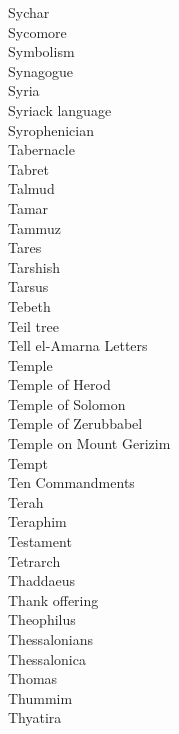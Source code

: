Sychar  \\
Sycomore  \\
Symbolism  \\
Synagogue  \\
Syria  \\
Syriack language  \\
Syrophenician  \\
Tabernacle  \\
Tabret  \\
Talmud  \\
Tamar  \\
Tammuz  \\
Tares  \\
Tarshish  \\
Tarsus  \\
Tebeth  \\
Teil tree  \\
Tell el-Amarna Letters  \\
Temple  \\
Temple of Herod  \\
Temple of Solomon  \\
Temple of Zerubbabel  \\
Temple on Mount Gerizim  \\
Tempt  \\
Ten Commandments  \\
Terah  \\
Teraphim  \\
Testament  \\
Tetrarch  \\
Thaddaeus  \\
Thank offering  \\
Theophilus  \\
Thessalonians  \\
Thessalonica  \\
Thomas  \\
Thummim  \\
Thyatira  \\

